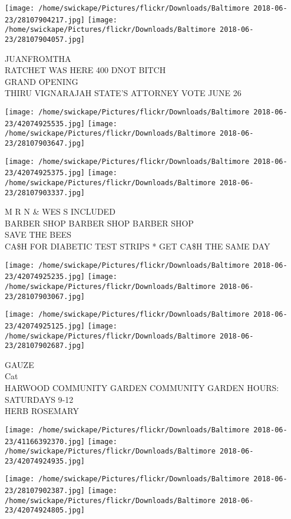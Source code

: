 \documentclass[10pt,letterpaper]{article}
\begin{document}
\texttt{[image: /home/swickape/Pictures/flickr/Downloads/Baltimore 2018-06-23/28107904217.jpg]}
\texttt{[image: /home/swickape/Pictures/flickr/Downloads/Baltimore 2018-06-23/28107904057.jpg]}

JUANFROMTHA\\
RATCHET WAS HERE 400 DNOT BITCH\\
GRAND OPENING\\
THIRU VIGNARAJAH STATE'S ATTORNEY VOTE JUNE 26\\
\pagebreak

\texttt{[image: /home/swickape/Pictures/flickr/Downloads/Baltimore 2018-06-23/42074925535.jpg]}
\texttt{[image: /home/swickape/Pictures/flickr/Downloads/Baltimore 2018-06-23/28107903647.jpg]}

\texttt{[image: /home/swickape/Pictures/flickr/Downloads/Baltimore 2018-06-23/42074925375.jpg]}
\texttt{[image: /home/swickape/Pictures/flickr/Downloads/Baltimore 2018-06-23/28107903337.jpg]}

M R N \& WES S INCLUDED\\
BARBER SHOP BARBER SHOP BARBER SHOP\\
SAVE THE BEES\\
CA\$H FOR DIABETIC TEST STRIPS * GET CA\$H THE SAME DAY\\
\pagebreak

\texttt{[image: /home/swickape/Pictures/flickr/Downloads/Baltimore 2018-06-23/42074925235.jpg]}
\texttt{[image: /home/swickape/Pictures/flickr/Downloads/Baltimore 2018-06-23/28107903067.jpg]}

\texttt{[image: /home/swickape/Pictures/flickr/Downloads/Baltimore 2018-06-23/42074925125.jpg]}
\texttt{[image: /home/swickape/Pictures/flickr/Downloads/Baltimore 2018-06-23/28107902687.jpg]}

GAUZE\\
Cat\\
HARWOOD COMMUNITY GARDEN COMMUNITY GARDEN HOURS: SATURDAYS 9{-}12\\
HERB ROSEMARY\\
\pagebreak

\texttt{[image: /home/swickape/Pictures/flickr/Downloads/Baltimore 2018-06-23/41166392370.jpg]}
\texttt{[image: /home/swickape/Pictures/flickr/Downloads/Baltimore 2018-06-23/42074924935.jpg]}

\texttt{[image: /home/swickape/Pictures/flickr/Downloads/Baltimore 2018-06-23/28107902387.jpg]}
\texttt{[image: /home/swickape/Pictures/flickr/Downloads/Baltimore 2018-06-23/42074924805.jpg]}
\end{document}
